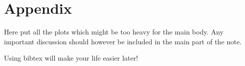 \documentclass[12pt,a4paper]{article}
\begin{document}
\renewcommand{\thefootnote}{\fnsymbol{footnote}}
\setcounter{footnote}{1}


% 
% 

\renewcommand{\thefootnote}{\arabic{footnote}}
\setcounter{footnote}{0}

\tableofcontents
\cleardoublepage



\pagestyle{plain} %
\setcounter{page}{1}

\linenumbers


% 

% 

% 

% 

% 

% 



% 

% 

% 

\section{Appendix}
Here put all the plots which might be too heavy for the 
main body. Any important discussion should however be included
in the main part of the note.
\\



Using bibtex will make your life easier later!
\end{document}
